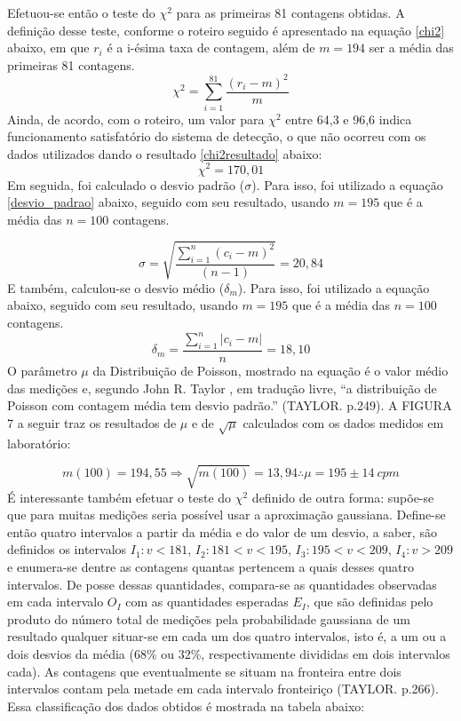 \documentclass{article}
\begin{document}
Efetuou-se então o teste do $\chi ^2$ para as primeiras 81 contagens obtidas. A definição desse teste, conforme o roteiro seguido \cite{fisicaexpV} é apresentado na equação \ref{chi2} abaixo, em que $r _i$ é a i-ésima taxa de contagem, além de $m = 194$ ser a média das primeiras 81 contagens.
\begin{equation}
   \label{chi2}
	\chi ^2 = \sum_{i=1} ^{81}\frac{(r_i - m)^2}{m}
\end{equation}Ainda, de acordo, com o roteiro, um valor para $\chi ^2$ entre 64,3 e 96,6 indica funcionamento satisfatório do sistema de detecção, o que não ocorreu com os dados utilizados dando o resultado \ref{chi2resultado} abaixo:
\begin{equation}
	\label{chi2resultado}
	\chi ^2 = 170,01
\end{equation}Em seguida, foi calculado o desvio padrão ($\sigma$). Para isso, foi utilizado a equação \ref{desvio_padrao} abaixo, seguido com seu resultado, usando $m = 195$ que é a média das $n = 100$ contagens.

\begin{equation}
	\label{desvio_padrao}
    \sigma = \sqrt{\frac{\sum _{i=1} ^{n} (c_i -m)^2}{(n-1)}} = 20,84
\end{equation}
E também, calculou-se o desvio médio ($\delta _m$). Para isso, foi utilizado a equação abaixo, seguido com seu resultado, usando $m =195$ que é a média das $n=100$ contagens.
\begin{equation}
	\delta _m = \frac{\sum _{i=1} ^{n} |c _i - m|}{n} = 18,10
\end{equation}
O parâmetro $\mu$ da Distribuição de Poisson, mostrado na equação  é o valor médio das medições e, segundo John R. Taylor , em tradução livre, “a distribuição de Poisson com contagem média tem desvio padrão.” (TAYLOR. p.249)\cite{taylor}. A FIGURA 7 a seguir traz os resultados de $\mu$ e de $\sqrt{\mu}$ calculados com os dados medidos em laboratório:

\begin{equation}
	m(100) = 194,55 \Rightarrow \sqrt{m(100)} = 13,94 \therefore \mu = 195 \pm 14 \ cpm
\end{equation}
É interessante também efetuar o teste do $\chi ^2$ definido de outra forma: supõe-se que para muitas medições seria possível usar a aproximação gaussiana. Define-se então quatro intervalos a partir da média e do valor de um desvio, a saber, são definidos os intervalos $I_1: v < 181$, $I_2 : 181 < v < 195$, $I _3 : 195 < v < 209$, $I_4 : v > 209$ e enumera-se dentre as contagens quantas pertencem a quais desses quatro intervalos. De posse dessas quantidades, compara-se as quantidades observadas em cada intervalo $O_I$ com as quantidades esperadas $E_I$, que são definidas pelo produto do número total de medições pela probabilidade gaussiana de um resultado qualquer situar-se em cada um dos quatro intervalos, isto é, a um ou a dois desvios da média (68\% ou 32\%, respectivamente divididas em dois intervalos cada). As contagens que eventualmente se situam na fronteira entre dois intervalos contam pela metade em cada intervalo fronteiriço (TAYLOR. p.266)\cite{taylor}. Essa classificação dos dados obtidos é mostrada na tabela abaixo:
\end{document}
